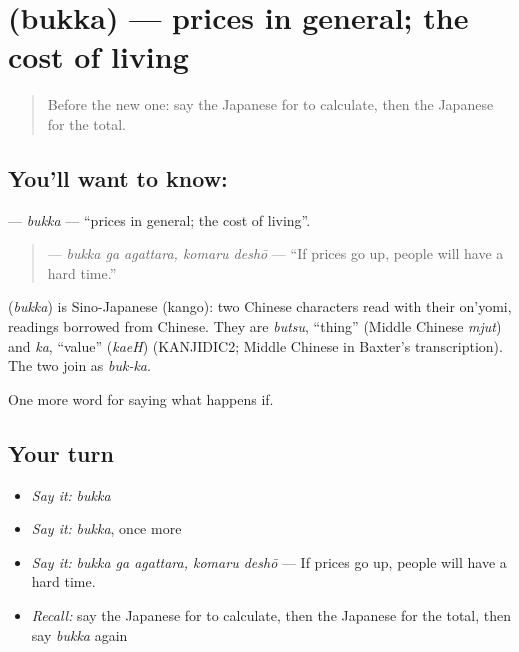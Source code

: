 \section[\texorpdfstring{\ja{ぶっか} (bukka)}{ぶっか (bukka)}]{ (bukka) — prices in general; the cost of living}

\label{lesson:JA-C362-bukka}



\begin{quote}
Before the new one: say the Japanese for to calculate, then the Japanese for the total.
\end{quote}

\subsection*{You'll want to know: }
\textbf{} — \emph{bukka} — \textquotedblleft{}prices in general; the cost of living\textquotedblright{}.

\begin{quote}
\textbf{ } — \emph{bukka ga agattara, komaru deshō} — \textquotedblleft{}If prices go up, people will have a hard time.\textquotedblright{}
\end{quote}

\begin{cousinweb}
\textbf{} (\emph{bukka}) is Sino-Japanese (kango): two Chinese characters read with their on'yomi, readings borrowed from Chinese. They are \emph{butsu}, \textquotedblleft{}thing\textquotedblright{} (Middle Chinese \emph{mjut}) and \emph{ka}, \textquotedblleft{}value\textquotedblright{} (\emph{kaeH}) (KANJIDIC2; Middle Chinese in Baxter's transcription). The two join as \emph{buk-ka}.
\end{cousinweb}

\begin{grammarlens}[title={What you've built}]
One more word for saying what happens if.
\end{grammarlens}

\subsection*{Your turn}
\begin{itemize}
\raggedright
  \item \emph{Say it:} \emph{bukka}
  \item \emph{Say it:} \emph{bukka}, once more
  \item \emph{Say it:} \emph{bukka ga agattara, komaru deshō} — If prices go up, people will have a hard time.
  \item \emph{Recall:} say the Japanese for to calculate, then the Japanese for the total, then say \emph{bukka} again
\end{itemize}

